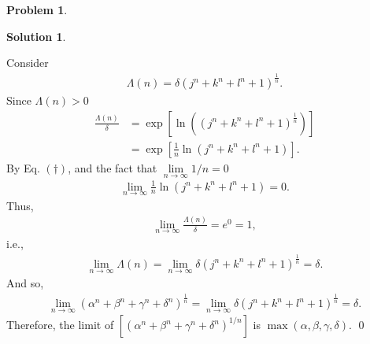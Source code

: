 \documentclass{book}
\theoremstyle{definition}
\newtheorem*{prob*}{Problem}
\newtheorem*{sln*}{Solution}
\begin{document}
\begin{prob*}
\begin{sln*}
\begin{enumerate}
\begin{enumerate}
				Consider 
				\begin{align*}
				\Lambda(n) = \delta \left(j^n + k^n + l^n + 1\right)^{\frac{1}{n}}.
				\end{align*}
				Since $\Lambda(n) > 0$
				\begin{align*}
				\frac{\Lambda(n)}{\delta}&= \exp\left[\ln\left( \left(j^n + k^n + l^n + 1\right)^{\frac{1}{n}}   \right)\right]\\
				&= \exp\left[\frac{1}{n}\ln(j^n + k^n + l^n + 1)\right].
				\end{align*}
				By Eq. $(\dagger)$, and the fact that $\lim\limits_{n\to\infty}1/n = 0$
				\begin{align*}
				\lim\limits_{n\to\infty} \frac{1}{n}\ln \left(j^n + k^n + l^n + 1\right)  = 0.
				\end{align*}
				Thus,
				\begin{align*}
				\lim\limits_{n\to\infty}\frac{\Lambda(n)}{\delta} = e^0 = 1,
				\end{align*}
				i.e.,
				\begin{align*}
				\lim\limits_{n\to\infty}\Lambda(n) = \lim\limits_{n\to\infty} \delta \left(j^n + k^n + l^n + 1\right)^{\frac{1}{n}} = \delta.
				\end{align*}
				And so,
				\begin{align*}
				\lim\limits_{n\to\infty}(\alpha^n + \beta^n + \gamma^n + \delta^n)^{\frac{1}{n}} = \lim\limits_{n\to\infty} \delta \left(j^n + k^n + l^n + 1\right)^{\frac{1}{n}} = \delta.
				\end{align*}
				Therefore, the limit of $[(\alpha^n + \beta^n + \gamma^n + \delta^n)^{1/n}]$ is $\max(\alpha,\beta,\gamma,\delta)$. \qed
				
				
				

				
				

\end{enumerate}
\end{enumerate}
\end{sln*}
\end{prob*}
\end{document}
